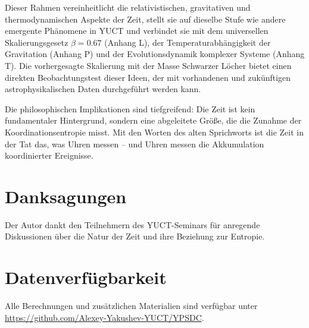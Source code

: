 \documentclass[12pt,a4paper]{article}
\begin{document}
	Dieser Rahmen vereinheitlicht die relativistischen, gravitativen und thermodynamischen Aspekte der Zeit, stellt sie auf dieselbe Stufe wie andere emergente Phänomene in YUCT und verbindet sie mit dem universellen Skalierungsgesetz \(\beta = 0.67\) (Anhang L), der Temperaturabhängigkeit der Gravitation (Anhang P) und der Evolutionsdynamik komplexer Systeme (Anhang T). Die vorhergesagte Skalierung mit der Masse Schwarzer Löcher bietet einen direkten Beobachtungstest dieser Ideen, der mit vorhandenen und zukünftigen astrophysikalischen Daten durchgeführt werden kann.
	
	Die philosophischen Implikationen sind tiefgreifend: Die Zeit ist kein fundamentaler Hintergrund, sondern eine abgeleitete Größe, die die Zunahme der Koordinationsentropie misst. Mit den Worten des alten Sprichworts ist die Zeit in der Tat das, was Uhren messen – und Uhren messen die Akkumulation koordinierter Ereignisse.
	
	\section*{Danksagungen}
	
	Der Autor dankt den Teilnehmern des YUCT-Seminars für anregende Diskussionen über die Natur der Zeit und ihre Beziehung zur Entropie.
	
	\section*{Datenverfügbarkeit}
	
	Alle Berechnungen und zusätzlichen Materialien sind verfügbar unter \url{https://github.com/Alexey-Yakushev-YUCT/YPSDC}.
	
\end{document}
